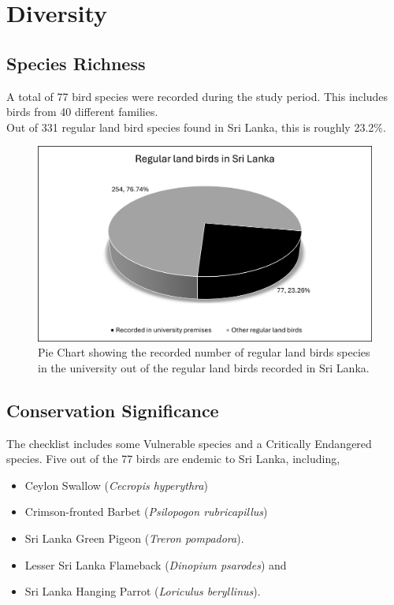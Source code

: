 \chapter{Diversity}
\label{cp:Diversity}

\section{Species Richness}
A total of 77 bird species were recorded during the study period. This includes birds from 40 different families.\\
Out of 331 regular land bird species found in Sri Lanka, this is roughly 23.2\%.

\begin{figure}[!htpb]
    \centering
    \includegraphics[width=\linewidth]{Figures/pieChart1.png}
    \caption[]{Pie Chart showing the recorded number of regular land birds species in the university out of the regular land birds recorded in Sri Lanka.}
    \label{fig:figure-01}
\end{figure}


\section{Conservation Significance}
The checklist includes some Vulnerable species and a Critically Endangered species. Five out of the 77 birds are endemic to Sri Lanka, including,
\begin{itemize}
    \item Ceylon Swallow (\textit{Cecropis hyperythra})
\item Crimson-fronted Barbet (\textit{Psilopogon rubricapillus})
\item Sri Lanka Green Pigeon (\textit{Treron pompadora}).
\item Lesser Sri Lanka Flameback (\textit{Dinopium psarodes}) and
 \item Sri Lanka Hanging Parrot (\textit{Loriculus beryllinus}).
\end{itemize}

